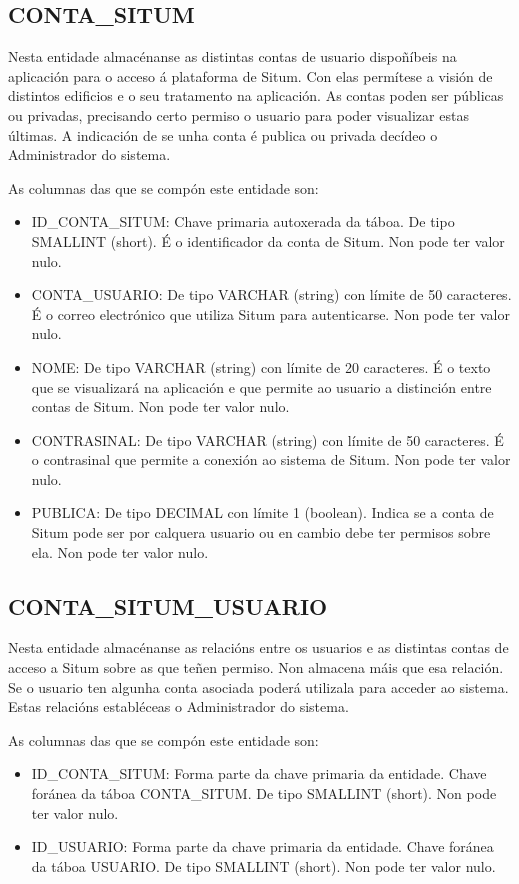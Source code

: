 \subsection{CONTA\_SITUM}
Nesta entidade almacénanse as distintas contas de usuario dispoñíbeis na aplicación para o acceso á plataforma de Situm. Con elas permítese a visión de distintos edificios e o seu tratamento na aplicación. As contas poden ser públicas ou privadas, precisando certo permiso o usuario para poder visualizar estas últimas. A indicación de se unha conta é publica ou privada decídeo o Administrador do sistema.

As columnas das que se compón este entidade son:
\begin{itemize}
	\item ID\_CONTA\_SITUM: Chave primaria autoxerada da táboa. De tipo SMALLINT (short). É o identificador da conta de Situm. Non pode ter valor nulo.
	\item CONTA\_USUARIO: De tipo VARCHAR (string) con límite de 50 caracteres. É o correo electrónico que utiliza Situm para autenticarse. Non pode ter valor nulo.
	\item NOME: De tipo VARCHAR (string) con límite de 20 caracteres. É o texto que se visualizará na aplicación e que permite ao usuario a distinción entre contas de Situm. Non pode ter valor nulo.
	\item CONTRASINAL: De tipo VARCHAR (string) con límite de 50 caracteres. É o contrasinal que permite a conexión ao sistema de Situm. Non pode ter valor nulo.
	\item PUBLICA: De tipo DECIMAL con límite 1 (boolean). Indica se a conta de Situm pode ser por calquera usuario ou en cambio debe ter permisos sobre ela. Non pode ter valor nulo.
\end{itemize}


\subsection{CONTA\_SITUM\_USUARIO}
Nesta entidade almacénanse as relacións entre os usuarios e as distintas contas de acceso a Situm sobre as que teñen permiso. Non almacena máis que esa relación. Se o usuario ten algunha conta asociada poderá utilizala para acceder ao sistema. Estas relacións establéceas o Administrador do sistema.

As columnas das que se compón este entidade son:
\begin{itemize}
	\item ID\_CONTA\_SITUM: Forma parte da chave primaria da entidade. Chave foránea da táboa CONTA\_SITUM. De tipo SMALLINT (short). Non pode ter valor nulo.
	\item ID\_USUARIO: Forma parte da chave primaria da entidade. Chave foránea da táboa USUARIO. De tipo SMALLINT (short). Non pode ter valor nulo.
\end{itemize}


